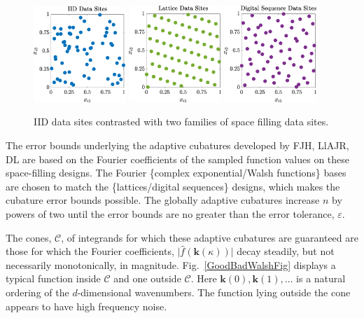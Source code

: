 \documentclass[11pt]{NSFamsart}
\newcommand{\hf}{\widehat{f}}
\newcommand{\bk}{{\boldsymbol{k}}}
\newcommand{\calc}{{\mathcal{C}}}
\newcommand{\bigabs}[1]{\ensuremath{\bigl \lvert #1 \bigr \rvert}}
\begin{document}
\begin{figure}[h] %
	\centering
	\includegraphics[width = 0.31\textwidth]{ProgramsImages/IIDPoints.eps} \quad
	\includegraphics[width = 0.31\textwidth]{ProgramsImages/ShiftedLatticePoints.eps}  \quad
	\includegraphics[width = 0.31\textwidth]{ProgramsImages/SSobolPoints.eps} 
	
	\caption{IID data sites contrasted with two families of space filling data sites.\label{PtsFig}}
\end{figure}

The error bounds underlying the adaptive cubatures developed by FJH, LlAJR, DL are based on the Fourier coefficients of the sampled function values on these space-filling designs.  The Fourier  \{complex exponential/Walsh functions\} bases are chosen to match the \{lattices/digital sequences\}  designs, which makes the cubature error bounds possible.  The globally adaptive cubatures increase $n$ by powers of two until the error bounds are no greater than the error tolerance, $\varepsilon$.

The cones, $\calc$, of integrands for which these adaptive cubatures are guaranteed are those for which  the Fourier coefficients, $\bigabs{\hf(\bk(\kappa))}$ decay steadily, but not necessarily monotonically, in magnitude.  Fig.\ \ref{GoodBadWalshFig} displays a typical function inside $\calc$ and one outside $\calc$. Here $\bk(0), \bk(1), \ldots$ is a natural ordering of the $d$-dimensional wavenumbers.  The function lying outside the cone appears to have high frequency noise. 
\end{document}
